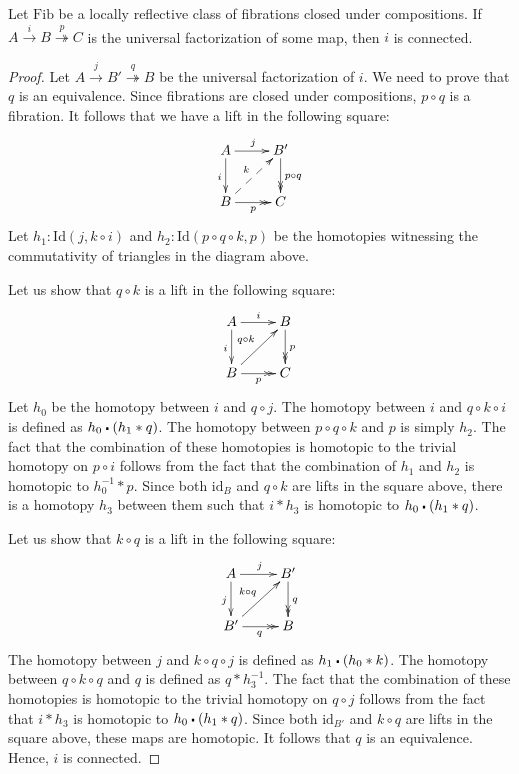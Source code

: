\documentclass[reqno]{amsart}
\theoremstyle{definition}
\theoremstyle{remark}
\newcommand{\fs}[1]{\mathrm{#1}}
\newcommand{\Id}{\fs{Id}}
\newcommand{\sym}[1]{#1^{-1}}
\newcommand{\id}{\fs{id}}
\newcommand{\Fib}{\fs{Fib}}
\numberwithin{figure}{section}
\newcommand{\ct}{%
  \mathchoice{\mathbin{\raisebox{0.25ex}{$\displaystyle\centerdot$}}}%
             {\mathbin{\raisebox{0.25ex}{$\centerdot$}}}%
             {\mathbin{\raisebox{0.25ex}{$\scriptstyle\,\centerdot\,$}}}%
             {\mathbin{\raisebox{0.25ex}{$\scriptscriptstyle\,\centerdot\,$}}}
}
\begin{document}
\begin{lem}
Let $\Fib$ be a locally reflective class of fibrations closed under compositions.
If $A \xrightarrow{i} B \overset{p}\twoheadrightarrow C$ is the universal factorization of some map, then $i$ is connected.
\end{lem}
\begin{proof}
Let $A \xrightarrow{j} B' \overset{q}\twoheadrightarrow B$ be the universal factorization of $i$.
We need to prove that $q$ is an equivalence.
Since fibrations are closed under compositions, $p \circ q$ is a fibration.
It follows that we have a lift in the following square:
\[ \xymatrix{ A \ar[r]^j \ar[d]_i               & B' \ar@{->>}[d]^{p \circ q} \\
              B \ar@{->>}[r]_p \ar@{-->}[ur]^k  & C
            } \]
Let $h_1 : \Id(j, k \circ i)$ and $h_2 : \Id(p \circ q \circ k, p)$ be the homotopies witnessing the commutativity of triangles in the diagram above.

Let us show that $q \circ k$ is a lift in the following square:
\[ \xymatrix{ A \ar[r]^i \ar[d]_i                   & B \ar@{->>}[d]^p \\
              B \ar@{->>}[r]_p \ar[ur]^{q \circ k}  & C
            } \]
Let $h_0$ be the homotopy between $i$ and $q \circ j$.
The homotopy between $i$ and $q \circ k \circ i$ is defined as $h_0 \ct (h_1 * q)$.
The homotopy between $p \circ q \circ k$ and $p$ is simply $h_2$.
The fact that the combination of these homotopies is homotopic to the trivial homotopy on $p \circ i$ follows from the fact that the combination of $h_1$ and $h_2$ is homotopic to $\sym{h_0} * p$.
Since both $\id_B$ and $q \circ k$ are lifts in the square above, there is a homotopy $h_3$ between them such that $i * h_3$ is homotopic to $h_0 \ct (h_1 * q)$.

Let us show that $k \circ q$ is a lift in the following square:
\[ \xymatrix{ A \ar[r]^j \ar[d]_j                   & B' \ar@{->>}[d]^q \\
              B' \ar@{->>}[r]_q \ar[ur]^{k \circ q} & B
            } \]
The homotopy between $j$ and $k \circ q \circ j$ is defined as $h_1 \ct (h_0 * k)$.
The homotopy between $q \circ k \circ q$ and $q$ is defined as $q * \sym{h_3}$.
The fact that the combination of these homotopies is homotopic to the trivial homotopy on $q \circ j$ follows from the fact that $i * h_3$ is homotopic to $h_0 \ct (h_1 * q)$.
Since both $\id_{B'}$ and $k \circ q$ are lifts in the square above, these maps are homotopic.
It follows that $q$ is an equivalence.
Hence, $i$ is connected.
\end{proof}
\end{document}
